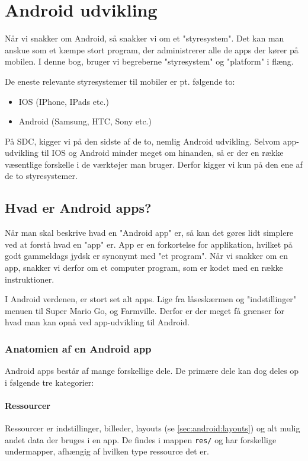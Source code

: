 \chapter{Android udvikling}

Når vi snakker om Android, så snakker vi om et "styresystem". Det kan man anskue som et kæmpe stort program, der administrerer alle de apps der kører på mobilen. I denne bog, bruger vi begreberne "styresystem" og "platform" i flæng.

De eneste relevante styresystemer til mobiler er pt. følgende to:

\begin{itemize}
	\item IOS (IPhone, IPads etc.)
	\item Android (Samsung, HTC, Sony etc.)
\end{itemize}

På SDC, kigger vi på den sidste af de to, nemlig Android udvikling. Selvom app-udvikling til IOS og Android minder meget om hinanden, så er der en række væsentlige forskelle i de værktøjer man bruger. Derfor kigger vi kun på den ene af de to styresystemer.

\section{Hvad er Android apps?}
Når man skal beskrive hvad en "Android app" er, så kan det gøres lidt simplere ved at forstå hvad en "app" er. App er en forkortelse for applikation, hvilket på godt gammeldags jydsk er synonymt med "et program". Når vi snakker om en app, snakker vi derfor om et computer program, som er kodet med en række instruktioner.

I Android verdenen, er stort set alt apps. Lige fra låseskærmen og "indstillinger" menuen til Super Mario Go, og Farmville. Derfor er der meget få grænser for hvad man kan opnå ved app-udvikling til Android.

\subsection{Anatomien af en Android app}
Android apps består af mange forskellige dele. De primære dele kan dog deles op i følgende tre kategorier:

\subsubsection{Ressourcer}
Ressourcer er indstillinger, billeder, layouts (se \autoref{sec:android:layouts}) og alt mulig andet data der bruges i en app. De findes i mappen \texttt{res/} og har forskellige undermapper, afhængig af hvilken type ressource det er.

